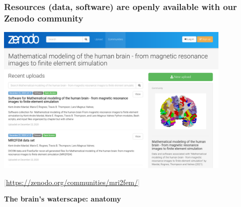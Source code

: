 \documentclass[mathserif, aspectratio=169]{beamer}
\newcommand{\refer}[1]{\begin{flushright}{\tiny \textcolor{darkgray}{[#1]}}\end{flushright}}
\newcommand{\mysection}[1]{\begin{frame} \begin{center} \vspace{3em} \textbf{#1} \end{center} \end{frame}}
\begin{document}
\begin{frame}
  \frametitle{Resources (data, software) are openly available with our Zenodo community}
  \vspace{-0.5em}
  \centering
  \includegraphics[width=0.85\textwidth]{graphics/mri2fem-zenodo.png} \\
  \vspace{-1em}
  \refer{\href{https://zenodo.org/communities/mri2fem/}{https://zenodo.org/communities/mri2fem/}}
\end{frame}


%
% 
%

\mysection{The brain's waterscape: anatomy}


\end{document}
